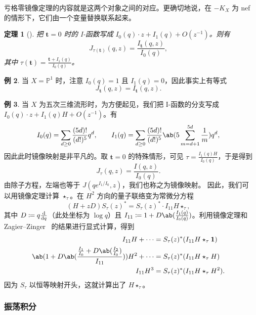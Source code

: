 \documentclass{amsart}
\newtheorem{thm}{定理}[section]
\theoremstyle{definition}
\newtheorem{exm}[thm]{例}
\theoremstyle{remark}
\theoremstyle{plain}
\theoremstyle{definition}
\theoremstyle{remark}
\renewcommand{\P}{\mathbb{P}}
\newcommand{\mbf}[1]{\mathbf{#1}}
\newcommand{\1}{\mathbf{1}}
\newcommand{\2}{\mathbf{2}}
\newcommand{\3}{\mathbf{3}}
\begin{document}
亏格零镜像定理的内容就是这两个对象之间的对应。更确切地说，在 \(-K_X\) 为 nef 的情形下，它们由一个变量替换联系起来。

\begin{thm}[{\cite{Givental1998,LLY1997}}]
    把 \(\mbf{t} = 0\) 时的 I-函数写成 \(I_0(q) \cdot z + I_1(q) + O(z^{-1})\)。则有
    \[
        J_{\tau(\mbf{t})}(q,z) = \frac{I_{\mbf{t}}(q,z)}{I_0(q)},
    \]
    其中 \(\tau(\mbf{t}) = \frac{\mbf{t} + I_1(q)}{I_0(q)}\)。
\end{thm}

\begin{exm}
    当 \(X = \P^1\) 时，注意 \(I_0(q) = 1\) 且 \(I_1(q) = 0\)，因此事实上有等式
    \[ J_{\mbf{t}}(q,z) = I_{\mbf{t}}(q,z). \]
\end{exm}

\begin{exm}
    当 \(X\) 为五次三维流形时，为方便起见，我们把 I-函数的分支写成 \(I_0(q) \cdot z + I_1(q)H + O(z^{-1})\)。有
    \[ I_0(q) = \sum_{d \geq 0} \frac{(5d)!}{(d!)^5} q^d, \qquad I_1(q) = \sum_{d \geq 0} \frac{(5d)!}{(d!)^5} \ab(5\sum_{m=d+1}^{5d} \frac{1}{m}) q^d, \]
    因此此时镜像映射是非平凡的。取 \(\mbf{t} = 0\) 的特殊情形，可见 \(\tau = \frac{I_1(q)H}{I_0(q)}\)，于是得到
    \[ J_{\tau}(q,z) = \frac{I(q,z)}{I_0(q)}. \]
    由除子方程，左端也等于 \(J(qe^{I_1/I_0}, z)\)，我们也称之为镜像映射。
    因此，我们可以用镜像定理计算 $\star_{\tau}$。在 \(H^2\) 方向的量子联络变为常微分方程
    \[ (H+zD) S_{\tau}(z)^* = S_{\tau}(z)^* \cdot I_{11} H \star_{\tau}, \]
    其中 $D \coloneqq q \odv{}{q}$（此处坐标为 $\log q$）且 $I_{11} \coloneqq 1 + D \ab(\frac{I_1(q)}{I_0(q)})$。利用镜像定理和 Zagier--Zinger~\cite{ZagierZinger2008} 的结果进行显式计算，得到
    \begin{align*}
        I_{11} H + \cdots &= S_{\tau}(z)^* (I_{11} H \star_{\tau} \1) \\
        \ab( 1 + D\ab(\frac{\frac{I_1}{I_0} + D \ab(\frac{I_2}{I_0})}{I_{11}}) ) H^2 + \cdots &= S_{\tau}(z)^* (I_{11} H \star_{\tau} H) \\
        I_{11} H^3 &= S_{\tau}(z)^* (I_{11}H \star_{\tau} H^2).
    \end{align*}
    因为 $S_{\tau}$ 以恒等映射开头，这就计算出了 $H \star_{\tau}$。
\end{exm}

\subsubsection{振荡积分}%
\label{ssub:Oscillating integrals}
\end{document}
